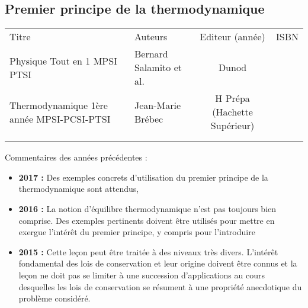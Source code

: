 \begin{headerBlock}
    \chapter{Premier principe de la thermodynamique}
    \label{LP_PremierPrincipe}
\end{headerBlock}




\begin{center}
\begin{tabularx}{\textwidth}{| X | X | c | c |}
  \hline
  \rowcolor{gray!20}\multicolumn{4}{c}{Bibliographie de la leçon : } \\
  \hline 
  Titre & Auteurs & Editeur (année) & ISBN \\
  \hline
 Physique Tout en 1 MPSI PTSI & Bernard Salamito et al.  & Dunod &    \\
  \hline 
 Thermodynamique 1ère année MPSI-PCSI-PTSI & Jean-Marie Brébec  & H Prépa (Hachette Supérieur)  &    \\
  \hline 
 &   &   &    \\
  \hline 
 &   &   &    \\
  \hline
\end{tabularx}
\end{center}

\begin{reportBlock}{Commentaires des années précédentes :}
    \begin{itemize}
        \item \textbf{2017 :} Des exemples concrets d’utilisation du premier principe de la thermodynamique sont attendus,
        \item \textbf{2016 :} La notion d’équilibre thermodynamique n’est pas toujours bien comprise. Des exemples pertinents doivent être utilisés pour mettre en exergue l’intérêt du premier principe, y compris pour l’introduire
        \item \textbf{2015 :} Cette leçon peut être traitée à des niveaux très divers. L’intérêt fondamental des lois de conservation et leur origine doivent être connus et la leçon ne doit pas se limiter à une succession d’applications au cours desquelles les lois de conservation se résument à une propriété anecdotique du problème considéré.
    \end{itemize}
\end{reportBlock}

